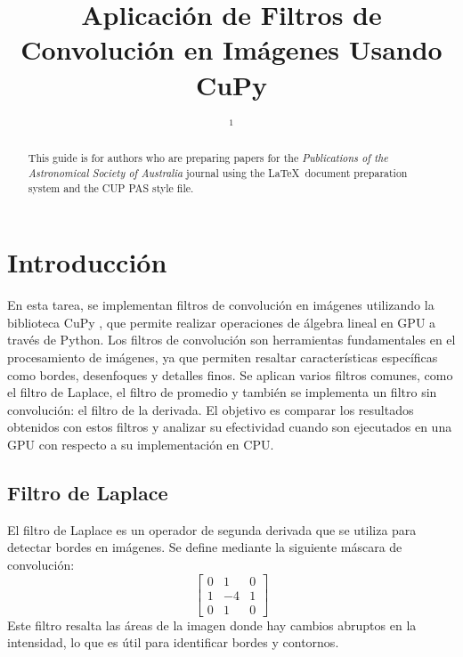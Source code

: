 \documentclass{pas}
\begin{document}



\title{Aplicación de Filtros de Convolución en Imágenes Usando CuPy}

\author{ $^{1}$}





\begin{abstract}
This guide is for authors who are preparing papers for the {\em Publications of the Astronomical Society of Australia} journal using the \LaTeX\ document preparation
system and the CUP PAS style file.
\end{abstract}


\maketitle

\section{Introducción}
En esta tarea, se implementan filtros de convolución en imágenes utilizando la biblioteca CuPy \cite{nishino2017cupy}, que permite realizar operaciones de álgebra lineal en GPU a través de Python. Los filtros de convolución son herramientas fundamentales en el procesamiento de imágenes, ya que permiten resaltar características específicas como bordes, desenfoques y detalles finos. Se aplican varios filtros comunes, como el filtro de Laplace, el filtro de promedio y también se implementa un filtro sin convolución: el filtro de la derivada. El objetivo es comparar los resultados obtenidos con estos filtros y analizar su efectividad cuando son ejecutados en una GPU con respecto a su implementación en CPU.

\subsection{Filtro de Laplace}
El filtro de Laplace es un operador de segunda derivada que se utiliza para detectar bordes en imágenes. Se define mediante la siguiente máscara de convolución:
\[\begin{bmatrix}
0 & 1 & 0 \\
1 & -4 & 1 \\
0 & 1 & 0
\end{bmatrix}\]
Este filtro resalta las áreas de la imagen donde hay cambios abruptos en la intensidad, lo que es útil para identificar bordes y contornos.
\end{document}
